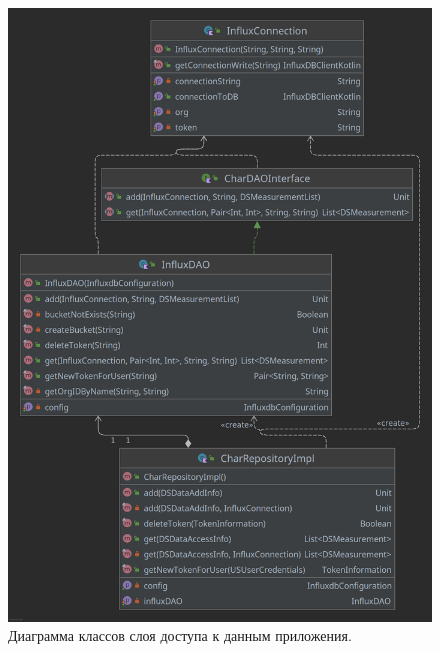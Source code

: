 \begin{figure}[H]
\begin{center}
\includegraphics[width=\textwidth]{img/dataLayerDiagram.png}
\captionsetup{justification=centering}
	\caption{Диаграмма классов слоя доступа к данным приложения. }
	\label{fig:dataLayer}
\end{center}
\end{figure}

